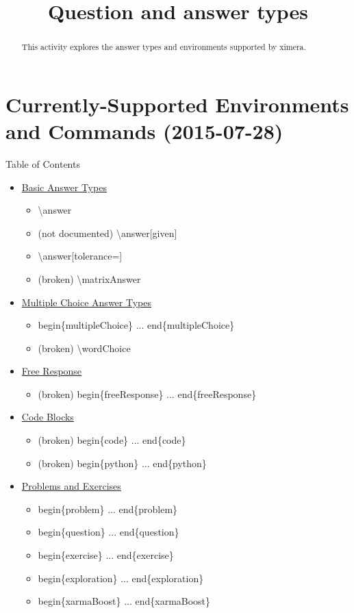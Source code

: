 \documentclass{ximera}
\title{Question and answer types}
\begin{document}
\begin{abstract}
  This activity explores the answer types and environments supported by ximera.
\end{abstract}

\maketitle

\section{Currently-Supported Environments and Commands (2015-07-28)}

\begin{remark} Table of Contents

\begin{itemize}
\item \hyperref[BasicAnswerType]{Basic Answer Types}
  \begin{itemize}
    \item \textbackslash answer
    \item (not documented) \textbackslash answer[given]
    \item \textbackslash answer[tolerance=]
    \item (broken) \textbackslash matrixAnswer  
  \end{itemize}
\item \hyperref[MCAnswerType]{Multiple Choice Answer Types}
  \begin{itemize}
    \item begin\{multipleChoice\} ... end\{multipleChoice\}
    \item (broken) \textbackslash wordChoice
  \end{itemize}    
\item \hyperref[FRAnswerType]{Free Response}
  \begin{itemize}   
    \item (broken) begin\{freeResponse\} ... end\{freeResponse\}
  \end{itemize}
\item \hyperref[CodeAnswers]{Code Blocks}
  \begin{itemize}
    \item (broken) begin\{code\} ... end\{code\}
    \item (broken) begin\{python\} ... end\{python\}
  \end{itemize}
\item \hyperref[ProblemContainers]{Problems and Exercises}
  \begin{itemize}
    \item begin\{problem\} ... end\{problem\}
    \item begin\{question\} ... end\{question\}
    \item begin\{exercise\} ... end\{exercise\}
    \item begin\{exploration\} ... end\{exploration\}
    \item begin\{xarmaBoost\} ... end\{xarmaBoost\}
  \end{itemize}
\end{itemize}

\end{remark}
\end{document}
